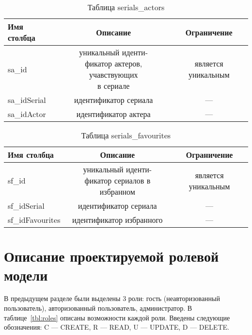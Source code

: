 \begin{table}[H]
    \begin{center}
        \caption{Таблица serials\_actors}
        \label{tbl:sa}
        \begin{tabular}{|l|c|c|}
            \hline
            Имя столбца & Описание & Ограничение \\ \hline
            sa\_id & \makecell{уникальный иденти-\\фикатор актеров, учавствующих\\в сериале} & является уникальным\\ \hline
            sa\_idSerial & идентификатор сериала & ---\\ \hline
            sa\_idActor & идентификатор актера & ---\\ \hline
        \end{tabular}
    \end{center}
\end{table}

\begin{table}[H]
    \begin{center}
        \caption{Таблица serials\_favourites}
        \label{tbl:sf}
        \begin{tabular}{|l|c|c|}
            \hline
            Имя столбца & Описание & Ограничение \\ \hline
            sf\_id & \makecell{уникальный иденти-\\фикатор сериалов в избранном} & является уникальным\\ \hline
            sf\_idSerial & идентификатор сериала & ---\\ \hline
            sf\_idFavourites & идентификатор избранного & ---\\ \hline
        \end{tabular}
    \end{center}
\end{table}


\section{Описание проектируемой ролевой модели}

В предыдущем разделе были выделены 3 роли: гость (неавторизованный пользователь), авторизованный пользователь, администратор.
В таблице~\ref{tbl:roles} описаны возможности каждой роли. Введены следующие обозначения: C --- CREATE, R --- READ, U --- UPDATE, D --- DELETE.

